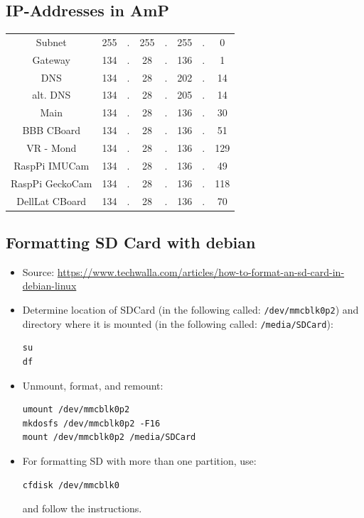 \documentclass[
	fontsize=10pt
	paper=a4
]{scrartcl}
\begin{document}
\subsection{IP-Addresses in AmP}
\begin{tabular}{c|ccccccc}
Subnet 		& 255 &.& 255 &.& 255 &.& 0 \\
Gateway 	& 134 &.& 28  &.& 136 &.& 1 \\
DNS	 	& 134 &.& 28  &.& 202 &.& 14 \\
alt. DNS 	& 134 &.& 28  &.& 205 &.& 14 \\

Main	 	& 134 &.& 28  &.& 136 &.& 30 \\
BBB CBoard 	& 134 &.& 28  &.& 136 &.& 51 \\
VR - Mond 	& 134 &.& 28  &.& 136 &.& 129 \\
RaspPi IMUCam 	& 134 &.& 28  &.& 136 &.& 49 \\
RaspPi GeckoCam	& 134 &.& 28  &.& 136 &.& 118 \\
DellLat CBoard 	& 134 &.& 28  &.& 136 &.& 70 \\

\end{tabular}



\subsection{Formatting SD Card with debian}

\begin{itemize}
\item Source: \url{https://www.techwalla.com/articles/how-to-format-an-sd-card-in-debian-linux}

\item Determine location of SDCard (in the following called: \texttt{/dev/mmcblk0p2}) and directory where it is mounted (in the following called: \texttt{/media/SDCard}):
\begin{lstlisting}
su
df
\end{lstlisting}

\item Unmount, format, and remount:
\begin{lstlisting}
umount /dev/mmcblk0p2
mkdosfs /dev/mmcblk0p2 -F16
mount /dev/mmcblk0p2 /media/SDCard
\end{lstlisting}

\item For formatting SD with more than one partition, use:
\begin{lstlisting}
cfdisk /dev/mmcblk0
\end{lstlisting}
and follow the instructions.
\end{itemize}
\end{document}
